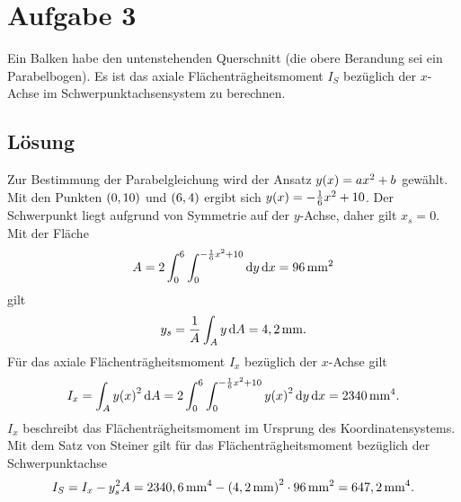 \documentclass{exercise}
\begin{document}
    \section*{Aufgabe 3}

    \begin{problem}
        Ein Balken habe den untenstehenden Querschnitt (die obere Berandung sei ein Parabelbogen).
        Es ist das axiale Flächenträgheitsmoment \(I_S\) bezüglich der \(x\)-Achse im Schwerpunktachsensystem zu berechnen.
        \begin{center}
        \end{center}
    \end{problem}

    \subsection*{Lösung}
    Zur Bestimmung der Parabelgleichung wird der Ansatz \(y\parentheses*{x} = ax^2 + b\) gewählt.
    Mit den Punkten \(\parentheses*{0, 10}\) und \(\parentheses*{6, 4}\) ergibt sich \(y\parentheses*{x} = -\frac{1}{6}x^2 + 10\).
    Der Schwerpunkt liegt aufgrund von Symmetrie auf der \(y\)-Achse, daher gilt \(x_s = 0\).
    Mit der Fläche
    \[
        A = 2\int_0^6 \int_0^{-\frac{1}{6}x^2 + 10}\d y\d x = 96\sis{\milli\meter\squared}
    \]
    gilt
    \[
        y_s = \frac{1}{A}\int_A y\d A = 4,2\sis{\milli\meter}.
    \]
    Für das axiale Flächenträgheitsmoment \(I_x\) bezüglich der \(x\)-Achse gilt
    \[
        I_x = \int_A y\parentheses*{x}^2\d A = 2\int_0^6 \int_0^{-\frac{1}{6}x^2 + 10}y\parentheses*{x}^2\d y\d x = 2340\sis{\milli\meter\tothe{4}}.
    \]
    \(I_x\) beschreibt das Flächenträgheitsmoment im Ursprung des Koordinatensystems.
    Mit dem Satz von Steiner gilt für das Flächenträgheitsmoment bezüglich der Schwerpunktachse
    \[
        I_S = I_x - y_s^2 A = 2340,6\sis{\milli\meter\tothe{4}} - \parentheses*{4,2\sis{\milli\meter}}^2 \cdot 96\sis{\milli\meter\squared} = 647,2\sis{\milli\meter\tothe{4}}.
    \]
\end{document}
